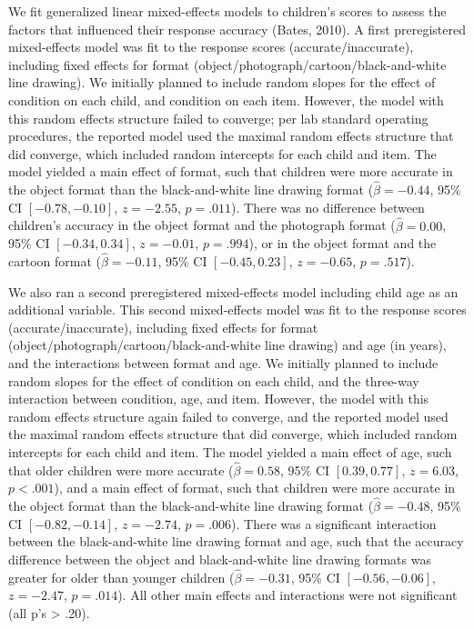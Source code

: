 \documentclass[10pt, letterpaper]{article}
\begin{document}
We fit generalized linear mixed-effects models to children's scores to
assess the factors that influenced their response accuracy (Bates,
2010). A first preregistered mixed-effects model was fit to the response
scores (accurate/inaccurate), including fixed effects for format
(object/photograph/cartoon/black-and-white line drawing). We initially
planned to include random slopes for the effect of condition on each
child, and condition on each item. However, the model with this random
effects structure failed to converge; per lab standard operating
procedures, the reported model used the maximal random effects structure
that did converge, which included random intercepts for each child and
item. The model yielded a main effect of format, such that children were
more accurate in the object format than the black-and-white line drawing
format (\(\hat{\beta} = -0.44\), 95\% CI \([-0.78, -0.10]\),
\(z = -2.55\), \(p = .011\)). There was no difference between children's
accuracy in the object format and the photograph format
(\(\hat{\beta} = 0.00\), 95\% CI \([-0.34, 0.34]\), \(z = -0.01\),
\(p = .994\)), or in the object format and the cartoon format
(\(\hat{\beta} = -0.11\), 95\% CI \([-0.45, 0.23]\), \(z = -0.65\),
\(p = .517\)).

We also ran a second preregistered mixed-effects model including child
age as an additional variable. This second mixed-effects model was fit
to the response scores (accurate/inaccurate), including fixed effects
for format (object/photograph/cartoon/black-and-white line drawing) and
age (in years), and the interactions between format and age. We
initially planned to include random slopes for the effect of condition
on each child, and the three-way interaction between condition, age, and
item. However, the model with this random effects structure again failed
to converge, and the reported model used the maximal random effects
structure that did converge, which included random intercepts for each
child and item. The model yielded a main effect of age, such that older
children were more accurate (\(\hat{\beta} = 0.58\), 95\% CI
\([0.39, 0.77]\), \(z = 6.03\), \(p < .001\)), and a main effect of
format, such that children were more accurate in the object format than
the black-and-white line drawing format (\(\hat{\beta} = -0.48\), 95\%
CI \([-0.82, -0.14]\), \(z = -2.74\), \(p = .006\)). There was a
significant interaction between the black-and-white line drawing format
and age, such that the accuracy difference between the object and
black-and-white line drawing formats was greater for older than younger
children (\(\hat{\beta} = -0.31\), 95\% CI \([-0.56, -0.06]\),
\(z = -2.47\), \(p = .014\)). All other main effects and interactions
were not significant (all p's \textgreater{} .20).
\end{document}
